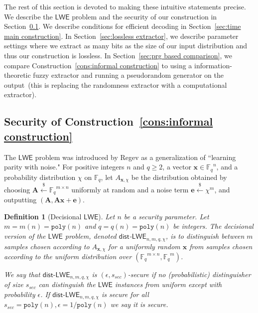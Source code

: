 \documentclass[11pt]{article}
\newcommand{\secref}[1]{\mbox{Section~\ref{#1}}}
\newcommand{\consref}[1]{\mbox{Construction~\ref{#1}}}
\newcommand{\class}[1]{{\ensuremath{\mathsf{#1}}}}
\newcommand{\vect}[1]{\ensuremath{\textbf{#1}}}
\newcommand{\Fq}{\ensuremath{\mathbb{F}_q}}
\newcommand{\poly}{\ensuremath{\mathtt{poly}}\xspace}
\newcommand{\lwe}{\class{LWE}}
\newcommand{\LWE}{\class{LWE}}
\newcommand{\distLWE}{\ensuremath{\class{dist\mbox{-}LWE}}}
\newtheorem{definition}[theorem]{Definition}
\newcommand{\ve}{\vect{e}}
\newcommand{\vA}{\vect{A}}
\newcommand{\vx}{\vect{x}}
\begin{document}
The rest of this section is devoted to making these intuitive statements precise.
 We describe the \class{LWE} problem and the security of our construction in \secref{subsec:LWE}.
We describe conditions for efficient decoding in \secref{sec:time main construction}.  In \secref{sec:lossless extractor}, we describe parameter settings where we extract as many bits as the size of our input distribution and thus our construction is lossless.  In \secref{sec:prg based comparison}, we compare \consref{cons:informal construction} to using a information-theoretic fuzzy extractor and running a pseudorandom generator on the output~(this is replacing the randomness extractor with a computational extractor).



\subsection{Security of \consref{cons:informal construction}}
\label{subsec:LWE}
The $\LWE$ problem was introduced by Regev \cite{regev2005LWE, regevLWEsurvey} as a generalization of ``learning parity with noise." For positive integers $n$ and $q \ge 2$, a vector $\vx \in \Fq^n$, and a probability distribution $\chi$ on $\Fq$, let $A_{\vect{x}, \chi}$ be the distribution obtained by choosing $\vA \overset{\$}\leftarrow \Fq^{m\times n}$ uniformly at random and a noise term $\ve \overset{\$}\leftarrow \chi^m$, and outputting $(\vA, \vA\vx+\ve)$. 

\begin{definition}[Decisional $\lwe$]\label{def:dist-LWE}Let $n$ be a security parameter.  
Let $m = m(n) = \poly(n)$ and $q = q(n) = \poly(n)$ be integers. The decisional version of the $\LWE$ problem, denoted \class{dist}-$\LWE_{n, m, q, \chi}$, is to distinguish between $m$ samples chosen according to $A_{\vx, \chi}$ for a uniformly random $\vx$ from samples chosen according to the uniform distribution over $(\Fq^{m\times n}, \Fq^m)$. 

We say that $\distLWE_{n, m, q, \chi}$ is $(\epsilon, s_{sec})$-secure if no (probabilistic) distinguisher of size $s_{sec}$ can distinguish the $\lwe$ instances from uniform except with probability $\epsilon$.  If $\distLWE_{n, m, q, \chi}$ is secure for all $s_{sec} = \poly(n), \epsilon  = 1/\poly(n)$ we say it is \emph{secure}.
\end{definition}
\end{document}
